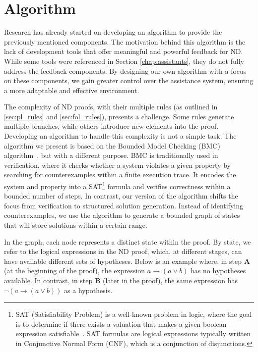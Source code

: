 \section{Algorithm}
Research has already started on developing an algorithm to provide the previously mentioned components. The motivation behind this algorithm is the lack of development tools that offer meaningful and powerful feedback for \gls{ND}. While some tools were referenced in Section \ref{chap:assistants}, they do not fully address the feedback components. By designing our own algorithm with a focus on these components, we gain greater control over the assistance system, ensuring a more adaptable and effective environment.

The complexity of \gls{ND} proofs, with their multiple rules (as outlined in \ref{sec:pl_rules} and \ref{sec:fol_rules}), presents a challenge. Some rules generate multiple branches, while others introduce new elements into the proof. Developing an algorithm to handle this complexity is not a simple task. The algorithm we present is based on the Bounded Model Checking (BMC) algorithm~\cite{biere2021bounded}, but with a different purpose. BMC is traditionally used in verification, where it checks whether a system violates a given property by searching for counterexamples within a finite execution trace. It encodes the system and property into a SAT\footnote{SAT (Satisfiability Problem) is a well-known problem in logic, where the goal is to determine if there exists a valuation that makes a given boolean expression satisfiable~\cite{You2019G2SATLT}. SAT formulas are logical expressions typically written in Conjunctive Normal Form (CNF), which is a conjunction of disjunctions.} formula and verifies correctness within a bounded number of steps. In contrast, our version of the algorithm shifts the focus from verification to structured solution generation. Instead of identifying counterexamples, we use the algorithm to generate a bounded graph of states that will store solutions within a certain range.

In the graph, each node represents a distinct state within the proof. By state, we refer to the logical expressions in the \gls{ND} proof, which, at different stages, can have available different sets of hypotheses. Below is an example where, in step \textbf{A} (at the beginning of the proof), the expression \(a \to (a \lor b)\) has no hypotheses available. In contrast, in step \textbf{B} (later in the proof), the same expression has \(\neg(a \to (a \lor b))\) as a hypothesis.

